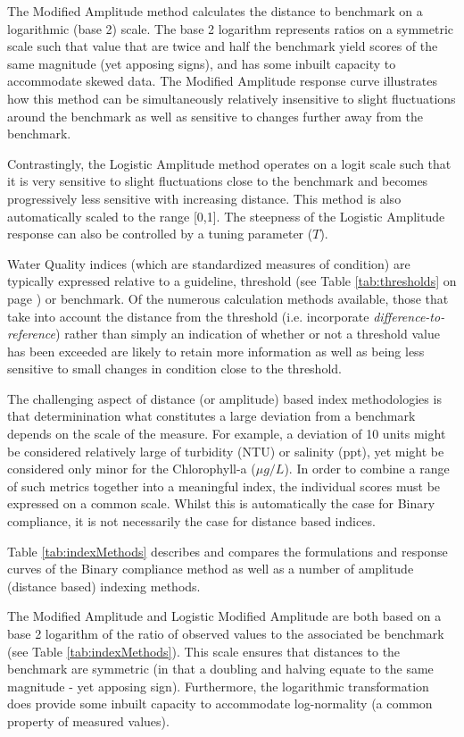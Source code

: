 The Modified Amplitude method calculates the distance to benchmark on a logarithmic (base 2) scale.
The base 2 logarithm represents ratios on a symmetric scale such that value that are twice and half
the benchmark yield scores of the same magnitude (yet apposing signs), and has some inbuilt capacity
to accommodate skewed data.  The Modified Amplitude response curve illustrates how this method can
be simultaneously relatively insensitive to slight fluctuations around the benchmark as well as
sensitive to changes further away from the benchmark.

Contrastingly, the Logistic Amplitude method operates on a logit scale such that it is very
sensitive to slight fluctuations close to the benchmark and becomes progressively less sensitive
with increasing distance.  This method is also automatically scaled to the range [0,1].  The
steepness of the Logistic Amplitude response can also be controlled by a tuning parameter ($T$).




Water Quality indices (which are standardized measures of condition) are typically expressed
relative to a guideline, threshold (see Table \ref{tab:thresholds} on page \pageref{tab:thresholds})
or benchmark. Of the numerous calculation methods available, those that take into account the
distance from the threshold (i.e. incorporate \emph{difference-to-reference}) rather than simply an
indication of whether or not a threshold value has been exceeded are likely to retain more
information as well as being less sensitive to small changes in condition close to the threshold.

The challenging aspect of distance (or amplitude) based index methodologies is that determinination
what constitutes a large deviation from a benchmark depends on the scale of the measure.  For
example, a deviation of 10 units might be considered relatively large of turbidity (NTU) or salinity
(ppt), yet might be considered only minor for the Chlorophyll-a ($\mu g/L$). In order to combine a
range of such metrics together into a meaningful index, the individual scores must be expressed on a
common scale.  Whilst this is automatically the case for Binary compliance, it is not necessarily
the case for distance based indices.
    
Table \ref{tab:indexMethods} describes and compares the formulations and response curves of the
Binary compliance method as well as a number of amplitude (distance based) indexing methods.

The Modified Amplitude and Logistic Modified Amplitude are both based on a base 2 logarithm of the
ratio of observed values to the associated be benchmark (see Table \ref{tab:indexMethods}).  This
scale ensures that distances to the benchmark are symmetric (in that a doubling and halving equate
to the same magnitude - yet apposing sign).  Furthermore, the logarithmic transformation does
provide some inbuilt capacity to accommodate log-normality (a common property of measured values).

